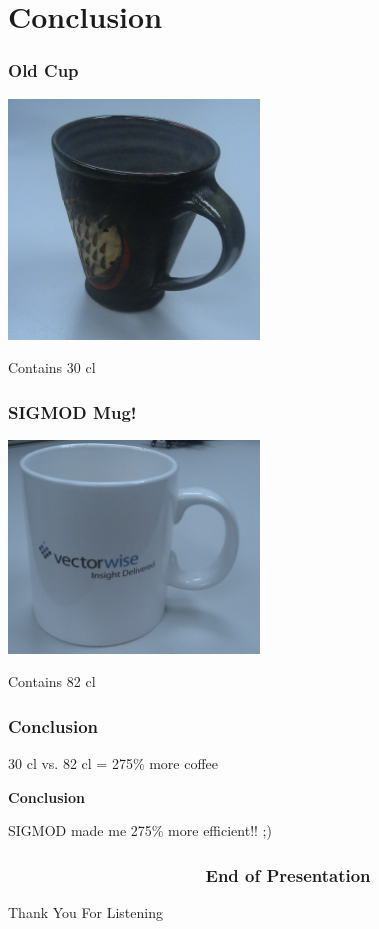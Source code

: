 \section{Conclusion} %
\begin{frame}[red] %
\frametitle{Old Cup}

    \includegraphics[width=0.5\textwidth]{images/con2.jpg} 

Contains 30 cl
 
\end{frame}

\begin{frame}
\frametitle{SIGMOD Mug!}


    \includegraphics[width=0.5\textwidth]{images/con1.jpg} 

Contains 82 cl
 
\end{frame}

\begin{frame}
\frametitle{Conclusion}
\vspace{1em}
30 cl vs. 82 cl = 275\% more coffee

\vspace{2em}
\Large \textbf{Conclusion}

SIGMOD made me 275\% more efficient!! ;)
 
\end{frame}






\begin{frame}[plain] %
\frametitle{\;~~~~~~~~~~~~~~~~~~~~~End of Presentation}

\vspace{9em}
\begin{center}
    \Huge Thank You For Listening
\end{center}
\end{frame}